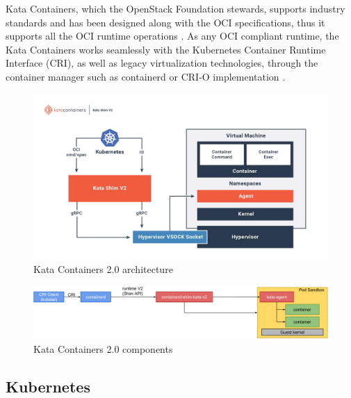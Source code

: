 Kata Containers, which the OpenStack Foundation stewards, supports industry standards and has been designed along with the OCI specifications, thus it supports all the OCI runtime operations \cite{Kumar2020}. As any OCI compliant runtime, the Kata Containers works seamlessly with the Kubernetes Container Runtime Interface (CRI)\cite{CRI}, as well as legacy virtualization technologies, through the container manager such as containerd or CRI-O implementation \cite{Randazzo2019}.

\begin{figure}[ht]
  \begin{center}
    \includegraphics[width=13.5cm]{images/KataContainersArchitecture.jpg}
    \caption{Kata Containers 2.0 architecture \cite{KataContainers}}
    \label{fig:KataContainersArchitecture}
  \end{center}
\end{figure}

\begin{figure}[ht]
  \begin{center}
    \includegraphics[width=13.5cm]{images/KataContainersComponents.png}
    \caption{Kata Containers 2.0 components \cite{KataContainersArchitecture}}
    \label{fig:KataContainersComponents}
  \end{center}
\end{figure}

\subsection{Kubernetes}

